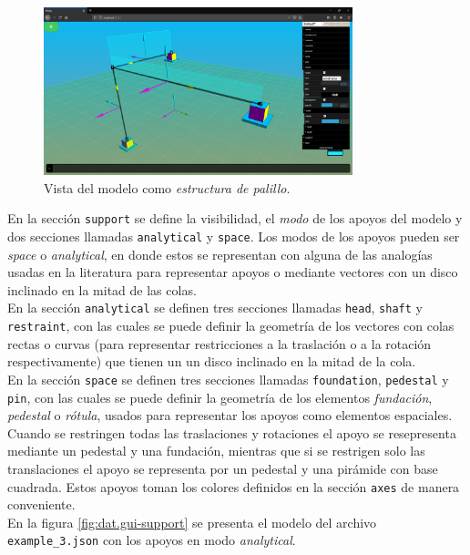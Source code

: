 \begin{figure}[ht]
  \centering
  \includegraphics[width=0.8\textwidth]{introduction/dat-gui-frame.png}
  \caption{Vista del modelo como \emph{estructura de palillo}.}
  \label{fig:dat.gui-frame}
\end{figure}

En la sección \verb|support| se define la visibilidad, el \emph{modo} de los apoyos del modelo y dos secciones llamadas \verb|analytical| y \verb|space|. Los modos de los apoyos pueden ser \emph{space} o \emph{analytical}, en donde estos se representan con alguna de las analogías usadas en la literatura para representar apoyos o mediante vectores con un disco inclinado en la mitad de las colas.\\

En la sección \verb|analytical| se definen tres secciones llamadas \verb|head|, \verb|shaft| y \verb|restraint|, con las cuales se puede definir la geometría de los vectores con colas rectas o curvas (para representar restricciones a la traslación o a la rotación respectivamente) que tienen un un disco inclinado en la mitad de la cola.\\

En la sección \verb|space| se definen tres secciones llamadas \verb|foundation|, \verb|pedestal| y \verb|pin|, con las cuales se puede definir la geometría de los elementos \emph{fundación}, \emph{pedestal} o \emph{rótula}, usados para representar los apoyos como elementos espaciales. Cuando se restringen todas las traslaciones y rotaciones el apoyo se resepresenta mediante un pedestal y una fundación, mientras que si se restrigen solo las translaciones el apoyo se representa por un pedestal y una pirámide con base cuadrada. Estos apoyos toman los colores definidos en la sección \verb|axes| de manera conveniente.\\

En la figura \ref{fig:dat.gui-support} se presenta el modelo del archivo \verb|example_3.json| con los apoyos en modo \emph{analytical}.\\

